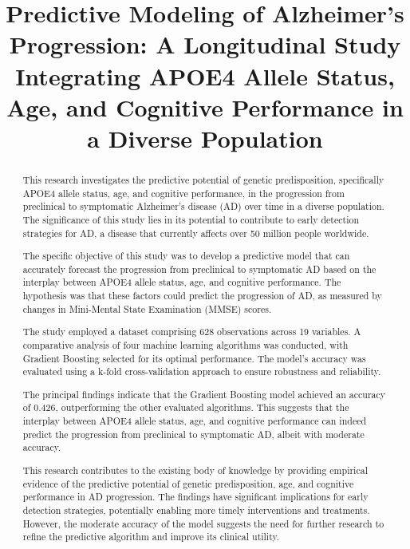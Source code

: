 \documentclass[conference]{IEEEtran}
\begin{document}
\title{Predictive Modeling of Alzheimer's Progression: A Longitudinal Study Integrating APOE4 Allele Status, Age, and Cognitive Performance in a Diverse Population}

\author{
}

\maketitle

\begin{abstract}
This research investigates the predictive potential of genetic predisposition, specifically APOE4 allele status, age, and cognitive performance, in the progression from preclinical to symptomatic Alzheimer's disease (AD) over time in a diverse population. The significance of this study lies in its potential to contribute to early detection strategies for AD, a disease that currently affects over 50 million people worldwide.

The specific objective of this study was to develop a predictive model that can accurately forecast the progression from preclinical to symptomatic AD based on the interplay between APOE4 allele status, age, and cognitive performance. The hypothesis was that these factors could predict the progression of AD, as measured by changes in Mini-Mental State Examination (MMSE) scores.

The study employed a dataset comprising 628 observations across 19 variables. A comparative analysis of four machine learning algorithms was conducted, with Gradient Boosting selected for its optimal performance. The model's accuracy was evaluated using a k-fold cross-validation approach to ensure robustness and reliability.

The principal findings indicate that the Gradient Boosting model achieved an accuracy of 0.426, outperforming the other evaluated algorithms. This suggests that the interplay between APOE4 allele status, age, and cognitive performance can indeed predict the progression from preclinical to symptomatic AD, albeit with moderate accuracy.

This research contributes to the existing body of knowledge by providing empirical evidence of the predictive potential of genetic predisposition, age, and cognitive performance in AD progression. The findings have significant implications for early detection strategies, potentially enabling more timely interventions and treatments. However, the moderate accuracy of the model suggests the need for further research to refine the predictive algorithm and improve its clinical utility.
\end{abstract}
\end{document}
